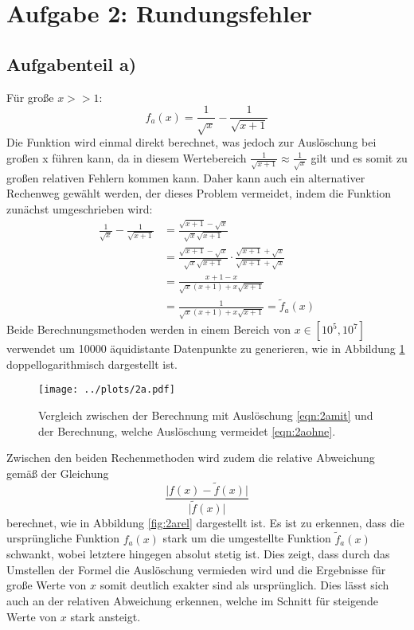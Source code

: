 \section*{Aufgabe 2: Rundungsfehler}
\subsection*{Aufgabenteil a)}
Für große $x>>1$:
\begin{equation}
  f_a(x)=\frac{1}{\sqrt{x}}-\frac{1}{\sqrt{x+1}}
  \label{eqn:2amit}
\end{equation}
Die Funktion wird einmal direkt berechnet, was jedoch zur Auslöschung bei großen x führen kann, da in diesem Wertebereich $\frac{1}{\sqrt{x+1}}\approx \frac{1}{\sqrt{x}}$ gilt und es somit zu großen relativen Fehlern kommen kann. Daher kann auch ein alternativer Rechenweg gewählt werden, der dieses Problem vermeidet, indem die Funktion zunächst umgeschrieben wird:
\begin{align}
  \frac{1}{\sqrt{x}}-\frac{1}{\sqrt{x+1}}&=\frac{\sqrt{x+1}-\sqrt{x}}{\sqrt{x}\sqrt{x+1}} \\
  &=\frac{\sqrt{x+1}-\sqrt{x}}{\sqrt{x}\sqrt{x+1}}\cdot\frac{\sqrt{x+1}+\sqrt{x}}{\sqrt{x+1}+\sqrt{x}}\\
  &=\frac{x+1-x}{\sqrt{x}(x+1)+x\sqrt{x+1}}\\
  &=\frac{1}{\sqrt{x}(x+1)+x\sqrt{x+1}}=\tilde{f}_a(x)
  \label{eqn:2aohne}
\end{align}
Beide Berechnungsmethoden werden in einem Bereich von $x\in[10^5,10^7]$ verwendet um 10000 äquidistante
Datenpunkte zu generieren, wie in Abbildung \ref{fig:2a} doppellogarithmisch dargestellt ist.

\begin{figure}[H]
  \centering
  \texttt{[image: ../plots/2a.pdf]}
  \caption{Vergleich zwischen der Berechnung mit Auslöschung \eqref{eqn:2amit} und der Berechnung, welche Auslöschung vermeidet \eqref{eqn:2aohne}.}
  \label{fig:2a}
\end{figure}

Zwischen den beiden Rechenmethoden wird zudem die relative Abweichung gemäß der Gleichung
\begin{equation}
  \frac{\lvert f(x)-\tilde{f}(x)\rvert}{\lvert \tilde{f}(x) \rvert}
  \label{eqn:abw}
\end{equation}
berechnet, wie in Abbildung \ref{fig:2arel} dargestellt ist. Es ist zu erkennen, dass die ursprüngliche Funktion $f_a(x)$ stark um die umgestellte Funktion $\tilde{f}_a(x)$ schwankt, wobei letztere hingegen absolut stetig ist. Dies zeigt, dass durch das Umstellen der Formel die Auslöschung vermieden wird und die Ergebnisse für große Werte von $x$ somit deutlich exakter sind als ursprünglich. Dies lässt sich auch an der relativen Abweichung erkennen, welche im Schnitt für steigende Werte von $x$ stark ansteigt.

